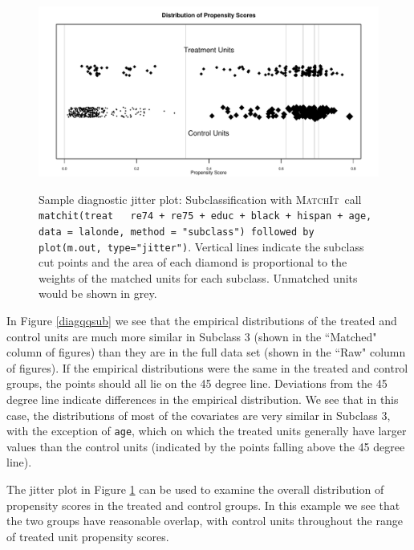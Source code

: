 \documentclass[oneside,letterpaper,titlepage]{article}
\newcommand{\MatchIt}{\textsc{MatchIt}}
\begin{document}
\begin{enumerate}
\begin{figure}[tbp]
  \begin{center}
    {\includegraphics[scale=0.5]{figs/jitterplotsub}}
    \hfill
\caption{Sample diagnostic jitter plot: Subclassification with
      \MatchIt\ call \texttt{matchit(treat ~ re74 + re75 + educ +
        black + hispan + age, data = lalonde, method = "subclass") followed by plot(m.out, type="jitter")}.
      Vertical lines indicate the subclass cut points and the area of
      each diamond is proportional to the weights of the matched units
      for each subclass.  Unmatched units would be shown in grey.}
\label{diagjittersub}
\end{center}
\end{figure}

In Figure \ref{diagqqsub} we see that the empirical distributions of the treated and control units are much more similar
in Subclass 3 (shown in the ``Matched" column of figures) than they are in the full data set (shown in the ``Raw" column of 
figures).  If the empirical distributions were the same in the treated and control groups, the points should all lie on the 45 
degree line.  Deviations from the 45 degree line indicate differences in the empirical distribution.  We see that in this case, 
the distributions of most of the covariates are very similar in Subclass 3, with the exception of \texttt{age}, which
on which the treated units generally have larger values than the control units (indicated by the points falling above the 45 
degree line).

The jitter plot in Figure \ref{diagjittersub} can be used to examine the overall distribution of propensity scores in the 
treated and control groups.  In this example we see that the two groups have reasonable overlap, with control units throughout 
the range of treated unit propensity scores.  


\end{enumerate}
\end{document}

